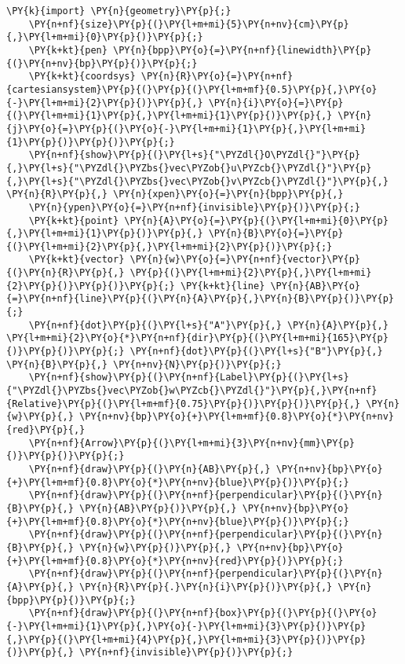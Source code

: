 \begin{Verbatim}[commandchars=\\\{\}]
    \PY{k}{import} \PY{n}{geometry}\PY{p}{;}
    \PY{n+nf}{size}\PY{p}{(}\PY{l+m+mi}{5}\PY{n+nv}{cm}\PY{p}{,}\PY{l+m+mi}{0}\PY{p}{)}\PY{p}{;}
    \PY{k+kt}{pen} \PY{n}{bpp}\PY{o}{=}\PY{n+nf}{linewidth}\PY{p}{(}\PY{n+nv}{bp}\PY{p}{)}\PY{p}{;}
    \PY{k+kt}{coordsys} \PY{n}{R}\PY{o}{=}\PY{n+nf}{cartesiansystem}\PY{p}{(}\PY{p}{(}\PY{l+m+mf}{0.5}\PY{p}{,}\PY{o}{-}\PY{l+m+mi}{2}\PY{p}{)}\PY{p}{,} \PY{n}{i}\PY{o}{=}\PY{p}{(}\PY{l+m+mi}{1}\PY{p}{,}\PY{l+m+mi}{1}\PY{p}{)}\PY{p}{,} \PY{n}{j}\PY{o}{=}\PY{p}{(}\PY{o}{-}\PY{l+m+mi}{1}\PY{p}{,}\PY{l+m+mi}{1}\PY{p}{)}\PY{p}{)}\PY{p}{;}
    \PY{n+nf}{show}\PY{p}{(}\PY{l+s}{"\PYZdl{}O\PYZdl{}"}\PY{p}{,}\PY{l+s}{"\PYZdl{}\PYZbs{}vec\PYZob{}u\PYZcb{}\PYZdl{}"}\PY{p}{,}\PY{l+s}{"\PYZdl{}\PYZbs{}vec\PYZob{}v\PYZcb{}\PYZdl{}"}\PY{p}{,} \PY{n}{R}\PY{p}{,} \PY{n}{xpen}\PY{o}{=}\PY{n}{bpp}\PY{p}{,}
    \PY{n}{ypen}\PY{o}{=}\PY{n+nf}{invisible}\PY{p}{)}\PY{p}{;}
    \PY{k+kt}{point} \PY{n}{A}\PY{o}{=}\PY{p}{(}\PY{l+m+mi}{0}\PY{p}{,}\PY{l+m+mi}{1}\PY{p}{)}\PY{p}{,} \PY{n}{B}\PY{o}{=}\PY{p}{(}\PY{l+m+mi}{2}\PY{p}{,}\PY{l+m+mi}{2}\PY{p}{)}\PY{p}{;}
    \PY{k+kt}{vector} \PY{n}{w}\PY{o}{=}\PY{n+nf}{vector}\PY{p}{(}\PY{n}{R}\PY{p}{,} \PY{p}{(}\PY{l+m+mi}{2}\PY{p}{,}\PY{l+m+mi}{2}\PY{p}{)}\PY{p}{)}\PY{p}{;} \PY{k+kt}{line} \PY{n}{AB}\PY{o}{=}\PY{n+nf}{line}\PY{p}{(}\PY{n}{A}\PY{p}{,}\PY{n}{B}\PY{p}{)}\PY{p}{;}
    \PY{n+nf}{dot}\PY{p}{(}\PY{l+s}{"A"}\PY{p}{,} \PY{n}{A}\PY{p}{,} \PY{l+m+mi}{2}\PY{o}{*}\PY{n+nf}{dir}\PY{p}{(}\PY{l+m+mi}{165}\PY{p}{)}\PY{p}{)}\PY{p}{;} \PY{n+nf}{dot}\PY{p}{(}\PY{l+s}{"B"}\PY{p}{,} \PY{n}{B}\PY{p}{,} \PY{n+nv}{N}\PY{p}{)}\PY{p}{;}
    \PY{n+nf}{show}\PY{p}{(}\PY{n+nf}{Label}\PY{p}{(}\PY{l+s}{"\PYZdl{}\PYZbs{}vec\PYZob{}w\PYZcb{}\PYZdl{}"}\PY{p}{,}\PY{n+nf}{Relative}\PY{p}{(}\PY{l+m+mf}{0.75}\PY{p}{)}\PY{p}{)}\PY{p}{,} \PY{n}{w}\PY{p}{,} \PY{n+nv}{bp}\PY{o}{+}\PY{l+m+mf}{0.8}\PY{o}{*}\PY{n+nv}{red}\PY{p}{,}
    \PY{n+nf}{Arrow}\PY{p}{(}\PY{l+m+mi}{3}\PY{n+nv}{mm}\PY{p}{)}\PY{p}{)}\PY{p}{;}
    \PY{n+nf}{draw}\PY{p}{(}\PY{n}{AB}\PY{p}{,} \PY{n+nv}{bp}\PY{o}{+}\PY{l+m+mf}{0.8}\PY{o}{*}\PY{n+nv}{blue}\PY{p}{)}\PY{p}{;}
    \PY{n+nf}{draw}\PY{p}{(}\PY{n+nf}{perpendicular}\PY{p}{(}\PY{n}{B}\PY{p}{,} \PY{n}{AB}\PY{p}{)}\PY{p}{,} \PY{n+nv}{bp}\PY{o}{+}\PY{l+m+mf}{0.8}\PY{o}{*}\PY{n+nv}{blue}\PY{p}{)}\PY{p}{;}
    \PY{n+nf}{draw}\PY{p}{(}\PY{n+nf}{perpendicular}\PY{p}{(}\PY{n}{B}\PY{p}{,} \PY{n}{w}\PY{p}{)}\PY{p}{,} \PY{n+nv}{bp}\PY{o}{+}\PY{l+m+mf}{0.8}\PY{o}{*}\PY{n+nv}{red}\PY{p}{)}\PY{p}{;}
    \PY{n+nf}{draw}\PY{p}{(}\PY{n+nf}{perpendicular}\PY{p}{(}\PY{n}{A}\PY{p}{,} \PY{n}{R}\PY{p}{.}\PY{n}{i}\PY{p}{)}\PY{p}{,} \PY{n}{bpp}\PY{p}{)}\PY{p}{;}
    \PY{n+nf}{draw}\PY{p}{(}\PY{n+nf}{box}\PY{p}{(}\PY{p}{(}\PY{o}{-}\PY{l+m+mi}{1}\PY{p}{,}\PY{o}{-}\PY{l+m+mi}{3}\PY{p}{)}\PY{p}{,}\PY{p}{(}\PY{l+m+mi}{4}\PY{p}{,}\PY{l+m+mi}{3}\PY{p}{)}\PY{p}{)}\PY{p}{,} \PY{n+nf}{invisible}\PY{p}{)}\PY{p}{;}
\end{Verbatim}

